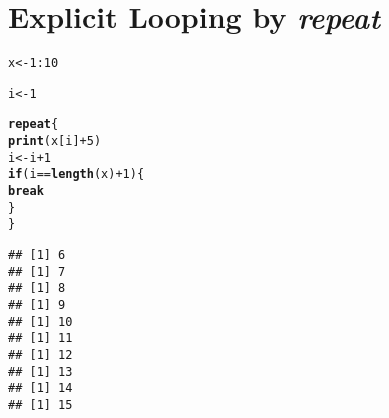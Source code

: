 \documentclass[11pt, a4paper]{article}\usepackage[]{graphicx}\usepackage[]{xcolor}
\makeatletter
\newcommand{\hlnum}[1]{\textcolor[rgb]{0.686,0.059,0.569}{#1}}%
\newcommand{\hlopt}[1]{\textcolor[rgb]{0,0,0}{#1}}%
\newcommand{\hldef}[1]{\textcolor[rgb]{0.345,0.345,0.345}{#1}}%
\newcommand{\hlkwa}[1]{\textcolor[rgb]{0.161,0.373,0.58}{\textbf{#1}}}%
\newcommand{\hlkwb}[1]{\textcolor[rgb]{0.69,0.353,0.396}{#1}}%
\newcommand{\hlkwd}[1]{\textcolor[rgb]{0.737,0.353,0.396}{\textbf{#1}}}%
\newenvironment{kframe}{%
 \def\at@end@of@kframe{}%
 \ifinner\ifhmode%
  \def\at@end@of@kframe{\end{minipage}}%
  \begin{minipage}{\columnwidth}%
 \fi\fi%
 \def\FrameCommand##1{\hskip\@totalleftmargin \hskip-\fboxsep
 \colorbox{shadecolor}{##1}\hskip-\fboxsep
     \hskip-\linewidth \hskip-\@totalleftmargin \hskip\columnwidth}%
 \MakeFramed {\advance\hsize-\width
   \@totalleftmargin\z@ \linewidth\hsize
   \@setminipage}}%
 {\par\unskip\endMakeFramed%
 \at@end@of@kframe}
\newenvironment{knitrout}{}{} %
\makeatother
\begin{document}
\section{Explicit Looping by \textit{repeat}}

\begin{knitrout}
\color{fgcolor}\begin{kframe}
\begin{alltt}
\hldef{x} \hlkwb{<-} \hlnum{1}\hlopt{:}\hlnum{10}

\hldef{i} \hlkwb{<-} \hlnum{1}

\hlkwa{repeat} \hldef{\{}
    \hlkwd{print}\hldef{(x[i]} \hlopt{+} \hlnum{5}\hldef{)}
    \hldef{i} \hlkwb{<-} \hldef{i} \hlopt{+} \hlnum{1}
    \hlkwa{if} \hldef{(i} \hlopt{==} \hlkwd{length}\hldef{(x)} \hlopt{+} \hlnum{1}\hldef{) \{}
        \hlkwa{break}
    \hldef{\}}
\hldef{\}}
\end{alltt}
\begin{verbatim}
## [1] 6
## [1] 7
## [1] 8
## [1] 9
## [1] 10
## [1] 11
## [1] 12
## [1] 13
## [1] 14
## [1] 15
\end{verbatim}
\end{kframe}
\end{knitrout}
\end{document}
